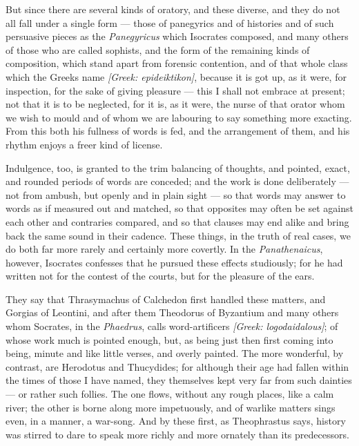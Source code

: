  But since there are several kinds of oratory, and these diverse, and they do not all fall under a single form — those of panegyrics and of histories and of such persuasive pieces as the \textit{Panegyricus} which Isocrates composed, and many others of those who are called sophists, and the form of the remaining kinds of composition, which stand apart from forensic contention, and of that whole class which the Greeks name \textit{[Greek: epideiktikon]}, because it is got up, as it were, for inspection, for the sake of giving pleasure — this I shall not embrace at present; not that it is to be neglected, for it is, as it were, the nurse of that orator whom we wish to mould and of whom we are labouring to say something more exacting. From this both his fullness of words is fed, and the arrangement of them, and his rhythm enjoys a freer kind of license.

 Indulgence, too, is granted to the trim balancing of thoughts, and pointed, exact, and rounded periods of words are conceded; and the work is done deliberately — not from ambush, but openly and in plain sight — so that words may answer to words as if measured out and matched, so that opposites may often be set against each other and contraries compared, and so that clauses may end alike and bring back the same sound in their cadence. These things, in the truth of real cases, we do both far more rarely and certainly more covertly. In the \textit{Panathenaicus}, however, Isocrates confesses that he pursued these effects studiously; for he had written not for the contest of the courts, but for the pleasure of the ears.

 They say that Thrasymachus of Calchedon first handled these matters, and Gorgias of Leontini, and after them Theodorus of Byzantium and many others whom Socrates, in the \textit{Phaedrus}, calls word-artificers \textit{[Greek: logodaidalous]}; of whose work much is pointed enough, but, as being just then first coming into being, minute and like little verses, and overly painted. The more wonderful, by contrast, are Herodotus and Thucydides; for although their age had fallen within the times of those I have named, they themselves kept very far from such dainties — or rather such follies. The one flows, without any rough places, like a calm river; the other is borne along more impetuously, and of warlike matters sings even, in a manner, a war-song. And by these first, as Theophrastus says, history was stirred to dare to speak more richly and more ornately than its predecessors.

